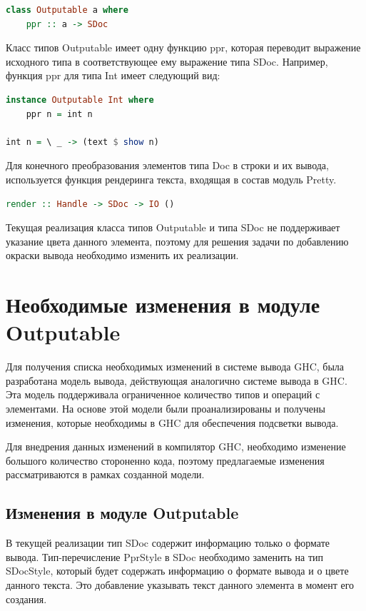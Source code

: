 \begin{lstlisting}[language=Haskell]
class Outputable a where
	ppr :: a -> SDoc
\end{lstlisting}

Класс типов Outputable имеет одну функцию ppr, которая переводит выражение исходного типа в соответствующее ему выражение типа SDoc. Например, функция ppr для типа Int имеет следующий вид:

\begin{lstlisting}[language=Haskell]
instance Outputable Int where
    ppr n = int n

int n = \ _ -> (text $ show n)

\end{lstlisting}

Для конечного преобразования элементов типа Doc в строки и их вывода, используется функция рендеринга текста, входящая в состав модуль Pretty.

\begin{lstlisting}[language=Haskell, caption=Типовая аннотация к функции рендеринга текста]
render :: Handle -> SDoc -> IO ()
\end{lstlisting}

Текущая реализация класса типов Outputable и типа SDoc не поддерживает указание цвета данного элемента, поэтому для решения задачи по добавлению окраски вывода необходимо изменить их реализации.

\section{Необходимые изменения в модуле Outputable}

Для получения списка необходимых изменений в системе вывода GHC, была разработана модель вывода, действующая аналогично системе вывода в GHC. Эта модель поддерживала ограниченное количество типов и операций с элементами. На основе этой модели были проанализированы и получены изменения, которые необходимы в GHC для обеспечения подсветки вывода.

Для внедрения данных изменений в компилятор GHC, необходимо изменение большого количество стороненно кода, поэтому предлагаемые изменения рассматриваются в рамках созданной модели.

\subsection{Изменения в модуле Outputable}

В текущей реализации тип SDoc содержит информацию только о формате вывода. Тип-перечисление PprStyle в SDoc необходимо заменить на тип SDocStyle, который будет содержать информацию о формате вывода и о цвете данного текста. Это добавление указывать текст данного элемента в момент его создания.

